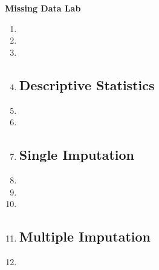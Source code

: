 \documentclass[a4paper,12pt]{article}
\begin{document}
\begin{center}
\textbf{Missing Data Lab}
\end{center}


\begin{enumerate}\itemsep0.5em

\subsection*{The Problem}


\item %
\item %
\item %
\item %

\subsection*{Descriptive Statistics}

\item %
\item %
\item %

\subsection*{Single Imputation}

\item %
\item %
\item %
\item %

\subsection*{Multiple Imputation}

\item %




\end{enumerate}
\end{document}

